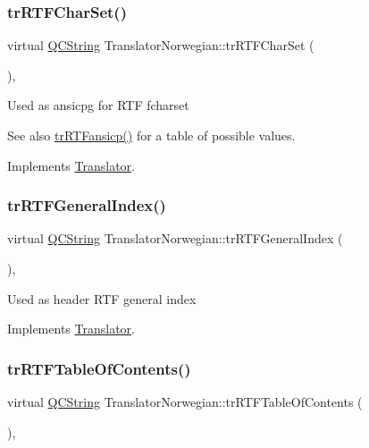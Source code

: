 \subsubsection{\texorpdfstring{trRTFCharSet()}{trRTFCharSet()}}
{\footnotesize\ttfamily virtual \mbox{\hyperlink{class_q_c_string}{Q\+C\+String}} Translator\+Norwegian\+::tr\+R\+T\+F\+Char\+Set (\begin{DoxyParamCaption}{ }\end{DoxyParamCaption})\hspace{0.3cm}{\ttfamily [inline]}, {\ttfamily [virtual]}}

Used as ansicpg for R\+TF fcharset \begin{DoxySeeAlso}{See also}
\mbox{\hyperlink{class_translator_norwegian_a53fc2ec893e9135938981db15869f645}{tr\+R\+T\+Fansicp()}} for a table of possible values. 
\end{DoxySeeAlso}


Implements \mbox{\hyperlink{class_translator_afad391f3cbfb5ce6332b7239f8e2049a}{Translator}}.

\mbox{\label{class_translator_norwegian_a763dc30e34241a86cb4c9d491c7ec5e6}} 
\subsubsection{\texorpdfstring{trRTFGeneralIndex()}{trRTFGeneralIndex()}}
{\footnotesize\ttfamily virtual \mbox{\hyperlink{class_q_c_string}{Q\+C\+String}} Translator\+Norwegian\+::tr\+R\+T\+F\+General\+Index (\begin{DoxyParamCaption}{ }\end{DoxyParamCaption})\hspace{0.3cm}{\ttfamily [inline]}, {\ttfamily [virtual]}}

Used as header R\+TF general index 

Implements \mbox{\hyperlink{class_translator}{Translator}}.

\mbox{\label{class_translator_norwegian_aa637a1bd0dc9d29ea61e8fdfb02d0bc4}} 
\subsubsection{\texorpdfstring{trRTFTableOfContents()}{trRTFTableOfContents()}}
{\footnotesize\ttfamily virtual \mbox{\hyperlink{class_q_c_string}{Q\+C\+String}} Translator\+Norwegian\+::tr\+R\+T\+F\+Table\+Of\+Contents (\begin{DoxyParamCaption}{ }\end{DoxyParamCaption})\hspace{0.3cm}{\ttfamily [inline]}, {\ttfamily [virtual]}}

